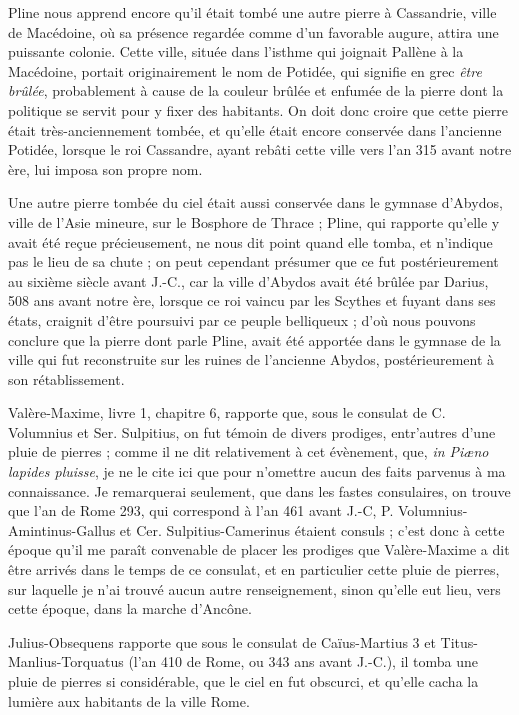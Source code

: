 \documentclass[a4paper, 12pt, oneside, french]{article}
\begin{document}
Pline nous apprend encore qu'il était tombé une autre pierre à Cassandrie, ville de Macédoine, où sa présence regardée comme d'un favorable augure, attira une puissante colonie. Cette ville, située dans l'isthme qui joignait Pallène à la Macédoine, portait originairement le nom de Potidée, qui signifie en grec \emph{être brûlée}, probablement à cause de la couleur brûlée et enfumée de la pierre dont la politique se servit pour y fixer des habitants. On doit donc croire que cette pierre était très-anciennement tombée, et qu'elle était encore conservée dans l'ancienne Potidée, lorsque le roi Cassandre, ayant rebâti cette ville vers l'an 315 avant notre ère, lui imposa son propre nom.

Une autre pierre tombée du ciel était aussi conservée dans le gymnase d'Abydos, ville de l'Asie mineure, sur le Bosphore de Thrace ; Pline, qui rapporte qu'elle y avait été reçue précieusement, ne nous dit point quand elle tomba, et n'indique pas le lieu de sa chute ; on peut cependant présumer que ce fut postérieurement au sixième siècle avant J.-C., car la ville d'Abydos avait été brûlée par Darius, 508 ans avant notre ère, lorsque ce roi vaincu par les Scythes et fuyant dans ses états, craignit d'être poursuivi par ce peuple belliqueux ; d'où nous pouvons conclure que la pierre dont parle Pline, avait été apportée dans le gymnase de la ville qui fut reconstruite sur les ruines de l'ancienne Abydos, postérieurement à son rétablissement.

Valère-Maxime, livre 1, chapitre 6, rapporte que, sous le consulat de C. Volumnius et Ser. Sulpitius, on fut témoin de divers prodiges, entr'autres d'une pluie de pierres ; comme il ne dit relativement à cet évènement, que, \emph{in Piæno lapides pluisse}, je ne le cite ici que pour n'omettre aucun des faits parvenus à ma connaissance. Je remarquerai seulement, que dans les fastes consulaires, on trouve que l'an de Rome 293, qui correspond à l'an 461 avant J.-C, P. Volumnius-Amintinus-Gallus et Cer. Sulpitius-Camerinus étaient consuls ; c'est donc à cette époque qu'il me paraît convenable de placer les prodiges que Valère-Maxime a dit être arrivés dans le temps de ce consulat, et en particulier cette pluie de pierres, sur laquelle je n'ai trouvé aucun autre renseignement, sinon qu'elle eut lieu, vers cette époque, dans la marche d'Ancône.

Julius-Obsequens rapporte que sous le consulat de Caïus-Martius 3 et Titus-Manlius-Torquatus (l'an 410 de Rome, ou 343 ans avant J.-C.), il tomba une pluie de pierres si considérable, que le ciel en fut obscurci, et qu'elle cacha la lumière aux habitants de la ville Rome.
\end{document}
